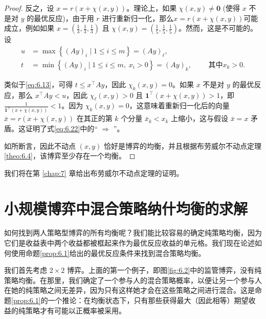\begin{proof}
反之，设 \(x = r\left( {x + \chi \left( {x,y}\right) }\right)\)。理论上，如果 \(\chi \left( {x,y}\right)  \neq  \mathbf{0}\) (使得 \(x\) 不是对 \(y\) 的最优反应)，由于用 \(r\) 进行重新归一化，那么\(x = r\left( {x + \chi \left( {x,y}\right) }\right)\)可能成立，例如如果 \(x = \left( {\frac{1}{3},\frac{1}{3},\frac{1}{3}}\right)\) 且 \(\chi \left( {x,y}\right)  = \left( {\frac{1}{5},\frac{1}{5},\frac{1}{5}}\right)\)。然而，这是不可能的。设
\begin{equation*}
\begin{aligned}
u
&= \max \left\{ (Ay)_i \mid 1 \le i \le m \right\}
 = (Ay)_{\ell}, \\
t
&= \min \left\{ (Ay)_i \mid 1 \le i \le m,\; x_i > 0 \right\}
 = (Ay)_k,
 \qquad \text{ 其中} x_k > 0.
\end{aligned}
\end{equation*}


类似于\eqref{eq:6.13}，可得 \(t \leq  {x}^{\top }{Ay}\)，因此 \({\chi }_{k}\left( {x,y}\right)  = 0\)。如果 \(x\) 不是对 \(y\) 的最优反应，那么 \({x}^{\top }{Ay} < u\)，因此 \({\chi }_{\ell }\left( {x,y}\right)  > 0\) 且 \({\mathbf{1}}^{\top }\left( {x + \chi \left( {x,y}\right) }\right)  > 1\)，即 \(\frac{1}{{\mathbf{1}}^{\top }\left( {x + \chi \left( {x,y}\right) }\right) } < 1\)。因为 \({\chi }_{k}\left( {x,y}\right)  = 0\)，这意味着重新归一化后的向量 \(\bar{x} = r\left( {x + \chi \left( {x,y}\right) }\right)\) 在其正的第 \(k\) 个分量 \({\bar{x}}_{k} < {x}_{k}\) 上缩小，这与假设 \(\bar{x} = x\) 矛盾。这证明了式\eqref{eq:6.22}中的“ \(\Rightarrow\) ”。

如所断言，因此不动点 $(x, y)$ 恰好是博弈的均衡，并且根据布劳威尔不动点定理\ref{theo:6.4}，该博弈至少存在一个均衡。
\end{proof}

我们将在第 \ref{chap:7} 章给出布劳威尔不动点定理的证明。
 
\section{小规模博弈中混合策略纳什均衡的求解}  \label{sec6.6}

如何找到两人策略型博弈的所有均衡呢？我们能比较容易的确定纯策略均衡，因为它们是收益表中两个收益都被框起来作为最优反应收益的单元格。我们现在论述如何使用命题\ref{prop:6.1}给出的最优反应条件来找到混合策略均衡。

我们首先考虑 \(2 \times  2\) 博弈。上面的第一个例子，即图\ref{fig:6.2}中的监管博弈，没有纯策略均衡。在那里，我们确定了一个参与人的混合策略概率，以便让另一个参与人在她的纯策略之间无差异，因为只有这样她才会在这些策略之间进行混合。这是命题\ref{prop:6.1}的一个推论：在均衡状态下，只有那些获得最大（因此相等）期望收益的纯策略才有可能以正概率被采用。

